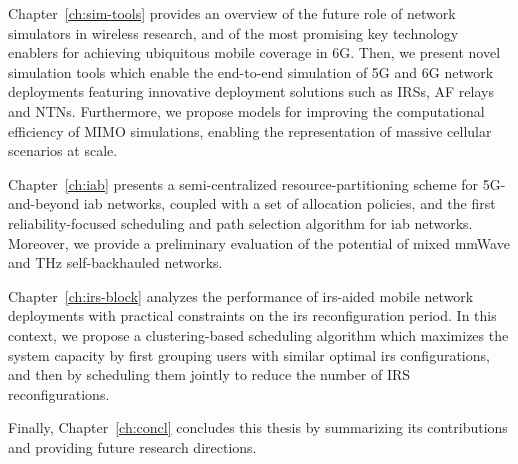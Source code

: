 Chapter~\ref{ch:sim-tools} provides an overview of the future role of network simulators in wireless research, and of the most promising key technology enablers for achieving ubiquitous mobile coverage in 6G. Then, we present novel simulation tools which enable the end-to-end simulation of 5G and 6G network deployments featuring innovative deployment solutions such as IRSs, AF relays and NTNs. Furthermore, we propose models for improving the computational efficiency of MIMO simulations, enabling the representation of massive cellular scenarios at scale.

Chapter~\ref{ch:iab} presents a semi-centralized resource-partitioning scheme for 5G-and-beyond \gls{iab} networks, coupled with a set of allocation policies, and the first reliability-focused scheduling and path selection algorithm for \gls{iab} networks. Moreover, we provide a preliminary evaluation of the potential of mixed mmWave and THz self-backhauled networks.

Chapter~\ref{ch:irs-block} analyzes the performance of \gls{irs}-aided mobile network deployments with practical constraints on the \gls{irs} reconfiguration period. 
In this context, we propose a clustering-based scheduling algorithm which maximizes the system capacity by first grouping users with similar optimal \gls{irs} configurations, and then by scheduling them jointly to reduce the number of IRS reconfigurations.

Finally, Chapter~\ref{ch:concl} concludes this thesis by summarizing its contributions and providing future research directions.